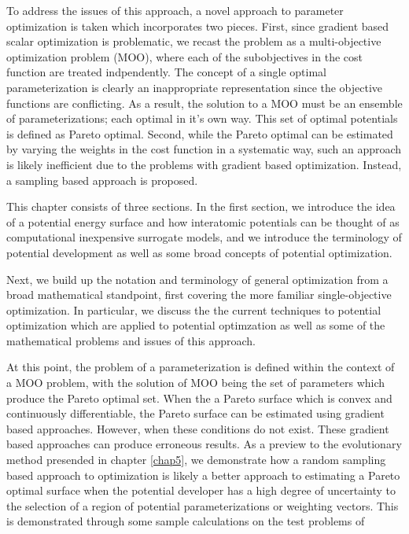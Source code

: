 To address the issues of this approach, a novel approach to parameter optimization is taken which incorporates two pieces.  First, since gradient based scalar optimization is problematic, we recast the problem as a multi-objective optimization problem (MOO), where each of the subobjectives in the cost function are treated indpendently.  The concept of a single optimal parameterization is clearly an inappropriate representation since the objective functions are conflicting.  As a result, the solution to a MOO must be an ensemble of parameterizations; each optimal in it's own way.  This set of optimal potentials is defined as Pareto optimal.  Second, while the Pareto optimal can be estimated by varying the weights in the cost function in a systematic way, such an approach is likely inefficient due to the problems with gradient based optimization.  Instead, a sampling based approach is proposed.

This chapter consists of three sections.  In the first section, we introduce the idea of a potential energy surface and how interatomic potentials can be thought of as computational inexpensive surrogate models, and we introduce the terminology of potential development as well as some broad concepts of potential optimization.

Next, we build up the notation and terminology of general optimization from a broad mathematical standpoint, first covering the more familiar single-objective optimization.  In particular, we discuss the the current techniques to potential optimization which are applied to potential optimzation as well as some of the mathematical problems and issues of this approach.

At this point, the problem of a parameterization is defined within the context of a MOO problem, with the solution of MOO being the set of parameters which produce the Pareto optimal set.  When the a Pareto surface which is convex and continuously differentiable, the Pareto surface can be estimated using gradient based approaches.  However, when these conditions do not exist.  These gradient based approaches can produce erroneous results.  As a preview to the evolutionary method presended in chapter \ref{chap5}, we demonstrate how a random sampling based approach to optimization is likely a better approach to estimating a Pareto optimal surface when the potential developer has a high degree of uncertainty to the selection of a region of potential parameterizations or weighting vectors.  This is demonstrated through some sample calculations on the test problems of 


